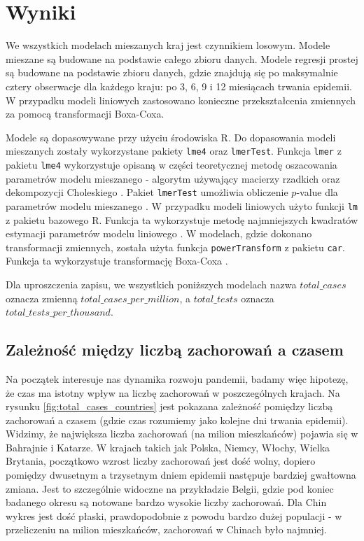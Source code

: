 \documentclass[12pt]{mwbk}
\theoremstyle{plain}
\theoremstyle{definition}
\theoremstyle{definition}
\begin{document}
 




\section{Wyniki}

We wszystkich modelach mieszanych kraj jest czynnikiem losowym. Modele mieszane są budowane na podstawie całego zbioru danych. Modele regresji prostej są budowane na podstawie zbioru danych, gdzie znajdują się po maksymalnie cztery obserwacje dla każdego kraju: po 3, 6, 9 i 12 miesiącach trwania epidemii. W przypadku modeli liniowych zastosowano konieczne przekształcenia zmiennych za pomocą transformacji Boxa-Coxa.

Modele są dopasowywane przy użyciu środowiska R. Do dopasowania modeli mieszanych zostały wykorzystane pakiety \texttt{lme4} oraz \texttt{lmerTest}. Funkcja \texttt{lmer} z pakietu \texttt{lme4} wykorzystuje opisaną w części teoretycznej metodę oszacowania parametrów modelu mieszanego - algorytm używający macierzy rzadkich oraz dekompozycji Choleskiego \cite{lme4}. Pakiet \texttt{lmerTest} umożliwia obliczenie $p$-value dla parametrów modelu mieszanego \cite{lmerTest}. W przypadku modeli liniowych użyto funkcji \texttt{lm} z pakietu bazowego R. Funkcja ta wykorzystuje metodę najmniejszych kwadratów estymacji parametrów modelu liniowego \cite{lm}. W modelach, gdzie dokonano transformacji zmiennych, została użyta funkcja \texttt{powerTransform} z pakietu \texttt{car}. Funkcja ta wykorzystuje transformację Boxa-Coxa \cite{powerTransform}.

Dla uproszczenia zapisu, we wszystkich poniższych modelach nazwa $total\_cases$ oznacza zmienną $total\_cases\_per\_million$, a $total\_tests$ oznacza \\$total\_tests\_per\_thousand$.

\subsection{Zależność między liczbą zachorowań a czasem}

Na początek interesuje nas dynamika rozwoju pandemii, badamy więc hipotezę, że czas ma istotny wpływ na liczbę zachorowań w poszczególnych krajach.
Na rysunku \ref{fig:total_cases_countries} jest pokazana zależność pomiędzy liczbą zachorowań a czasem (gdzie czas rozumiemy jako kolejne dni trwania epidemii). Widzimy, że największa liczba zachorowań (na milion mieszkańców) pojawia się w Bahrajnie i Katarze. W krajach takich jak Polska, Niemcy, Włochy, Wielka Brytania, początkowo wzrost liczby zachorowań jest dość wolny, dopiero pomiędzy dwusetnym a trzysetnym dniem epidemii następuje bardziej gwałtowna zmiana. Jest to szczególnie widoczne na przykładzie Belgii, gdzie pod koniec badanego okresu są notowane bardzo wysokie liczby zachorowań. Dla Chin wykres jest dość płaski, prawdopodobnie z powodu bardzo dużej populacji - w przeliczeniu na milion mieszkańców, zachorowań w Chinach było  najmniej.
\end{document}
